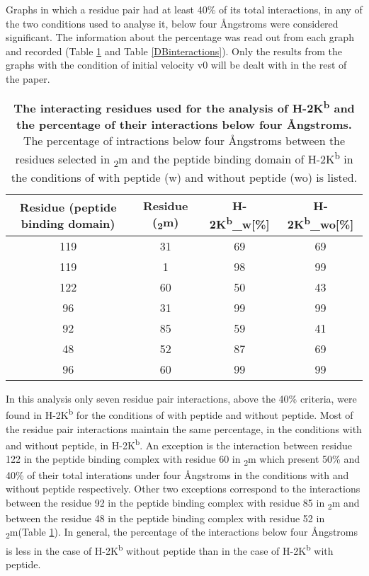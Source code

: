 \documentclass[11pt,twocolumn]{article}
\newcommand{\kb}{H-2K\textsuperscript{b}\xspace}
\newcommand{\angstr}{{\AA}ngstroms\xspace}
\newcommand{\btm}{\textbeta\textsubscript{2}m\xspace}
\begin{document}
Graphs in which a residue pair had at least 40\% of its total interactions, in any of the two conditions used to analyse it, below four \angstr were considered significant. The information about the percentage was read out from each graph and recorded (Table \ref{KBinteractions} and Table \ref{DBinteractions}). Only the results from the graphs with the condition of initial velocity v0 will be dealt with in the rest of the paper.


\begin{table}[H]
\caption{\textbf{The interacting residues used for the analysis of \kb and the percentage of their interactions below four \angstr. } The percentage of intractions below four \angstr between the residues selected in \btm and the peptide binding domain of \kb in the conditions of with peptide (w) and without peptide (wo) is listed.}
\label{KBinteractions}
\centering 
\resizebox{\linewidth}{!} {
\begin{tabular}{|c|c|c|c|}  \hline
Residue (peptide binding domain) &Residue (\btm)&\kb{\_}w[\%]&\kb{\_}wo[\%]\\ \hline
119&31&69&69\\ \hline
119&1&98&99\\ \hline
122&60&50&43\\ \hline
96&31&99&99\\ \hline
92&85&59&41\\ \hline
48&52&87&69\\ \hline
96&60&99&99\\ \hline
\end{tabular}
}
\end{table}

In this analysis only seven residue pair interactions, above the 40\% criteria, were found in \kb for the conditions of with peptide  and without peptide. Most of the residue pair interactions maintain the same percentage, in  the conditions with and without peptide, in  \kb. An exception is the interaction between  residue 122 in the peptide binding complex with residue 60 in \btm which present 50\% and 40\% of their total interations under four \angstr in the conditions with and without peptide respectively. Other two exceptions correspond to the interactions between the residue 92  in the peptide binding complex with residue 85 in \btm and between the residue 48 in the peptide binding complex with residue 52 in \btm (Table \ref{KBinteractions}). In general, the percentage of the interactions below four \angstr is less in the case of \kb without peptide than in the case of \kb with peptide.  
\end{document}
